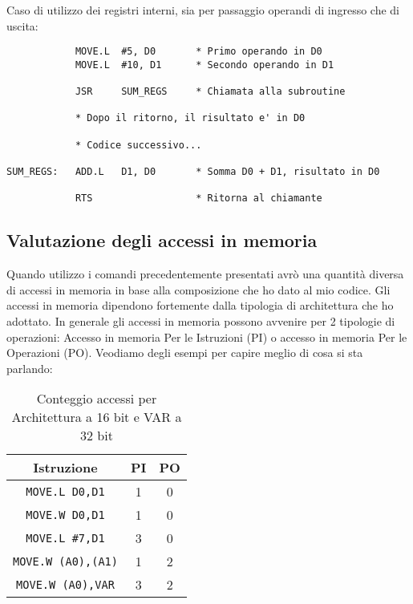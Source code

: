 Caso di utilizzo dei registri interni, sia per passaggio operandi di ingresso che di uscita:

\begin{lstlisting}
            MOVE.L  #5, D0       * Primo operando in D0
            MOVE.L  #10, D1      * Secondo operando in D1

            JSR     SUM_REGS     * Chiamata alla subroutine

            * Dopo il ritorno, il risultato e' in D0

            * Codice successivo...

SUM_REGS:   ADD.L   D1, D0       * Somma D0 + D1, risultato in D0

            RTS                  * Ritorna al chiamante

\end{lstlisting}

\subsection{Valutazione degli accessi in memoria}
Quando utilizzo i comandi precedentemente presentati avrò una quantità diversa di accessi in memoria in base alla composizione che ho dato al mio codice. Gli accessi in memoria dipendono fortemente dalla tipologia di architettura che ho adottato. In generale gli accessi in memoria possono avvenire per 2 tipologie di operazioni: Accesso in memoria Per le Istruzioni (PI) o accesso in memoria Per le Operazioni (PO).
Veodiamo degli esempi per capire meglio di cosa si sta parlando:
\begin{table}[h]
    \centering
    \begin{tabular}{|c|c|c|}
        \hline
        \textbf{Istruzione} & \textbf{PI} & \textbf{PO} \\ 
        \hline
        \lstinline|MOVE.L D0,D1| & 1 & 0 \\  
        \lstinline|MOVE.W D0,D1| & 1 & 0 \\  
        \lstinline|MOVE.L #7,D1| & 3 & 0 \\
        \lstinline|MOVE.W (A0),(A1)| & 1 & 2 \\
        \lstinline|MOVE.W (A0),VAR| & 3 & 2 \\ 
        \hline
    \end{tabular}
    \caption{Conteggio accessi per Architettura a 16 bit e VAR a 32 bit}
    \label{tab:esempio}
\end{table}

